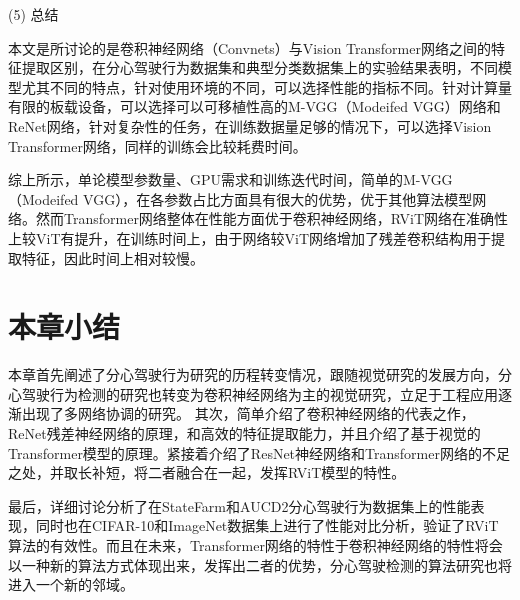 (5)	总结

本文是所讨论的是卷积神经网络（Convnets）与Vision Transformer网络之间的特征提取区别，在分心驾驶行为数据集和典型分类数据集上的实验结果表明，不同模型尤其不同的特点，针对使用环境的不同，可以选择性能的指标不同。针对计算量有限的板载设备，可以选择可以可移植性高的M-VGG（Modeifed VGG）网络和ReNet网络，针对复杂性的任务，在训练数据量足够的情况下，可以选择Vision Transformer网络，同样的训练会比较耗费时间。

综上所示，单论模型参数量、GPU需求和训练迭代时间，简单的M-VGG（Modeifed VGG），在各参数占比方面具有很大的优势，优于其他算法模型网络。然而Transformer网络整体在性能方面优于卷积神经网络，RViT网络在准确性上较ViT有提升，在训练时间上，由于网络较ViT网络增加了残差卷积结构用于提取特征，因此时间上相对较慢。

\section{本章小结}

本章首先阐述了分心驾驶行为研究的历程转变情况，跟随视觉研究的发展方向，分心驾驶行为检测的研究也转变为卷积神经网络为主的视觉研究，立足于工程应用逐渐出现了多网络协调的研究。
其次，简单介绍了卷积神经网络的代表之作，ReNet残差神经网络的原理，和高效的特征提取能力，并且介绍了基于视觉的Transformer模型的原理。紧接着介绍了ResNet神经网络和Transformer网络的不足之处，并取长补短，将二者融合在一起，发挥RViT模型的特性。

最后，详细讨论分析了在StateFarm和AUCD2分心驾驶行为数据集上的性能表现，同时也在CIFAR-10和ImageNet数据集上进行了性能对比分析，验证了RViT算法的有效性。而且在未来，Transformer网络的特性于卷积神经网络的特性将会以一种新的算法方式体现出来，发挥出二者的优势，分心驾驶检测的算法研究也将进入一个新的邻域。



